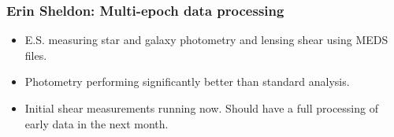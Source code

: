 \documentclass{beamer}
\begin{document}
\frame
{
    \frametitle{Erin Sheldon: Multi-epoch data processing}

    \begin{itemize}

        \item E.S. measuring star and galaxy photometry and 
            lensing shear using MEDS files.

        \item Photometry performing significantly better than
            standard analysis.

        \item Initial shear measurements running now.  Should have a full
            processing of early data in the next month.

    \end{itemize}
}
\end{document}
